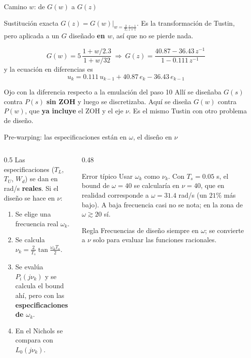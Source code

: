 \documentclass[aspectratio=169,11pt]{beamer}
\begin{document}
\begin{frame}{Camino $w$: de $G(w)$ a $G(z)$}
  \small
  \begin{block}{Sustitución exacta}
    $G(z)=G(w)\big|_{w=\frac{2}{T_s}\frac{z-1}{z+1}}$. Es la transformación de Tustin, pero aplicada a un $G$ diseñado \textbf{en $w$}, así que no se pierde nada.
  \end{block}
  \[ G(w)=5\,\frac{1+w/2.3}{1+w/32}\ \Rightarrow\ G(z)=\frac{40.87-36.43\,z^{-1}}{1-0.111\,z^{-1}} \]
  y la ecuación en diferencias es
  \[ u_k=0.111\,u_{k-1}+40.87\,e_k-36.43\,e_{k-1} \]
  \begin{alertblock}{Ojo con la diferencia respecto a la emulación del paso 10}
    Allí se diseñaba $G(s)$ contra $P(s)$ \textbf{sin ZOH} y luego se discretizaba. Aquí se diseña $G(w)$ contra $P(w)$, que \textbf{ya incluye} el ZOH y el eje $\nu$. Es el mismo Tustin con otro problema de diseño.
  \end{alertblock}
\end{frame}

\begin{frame}{Pre-warping: las especificaciones están en $\omega$, el diseño en $\nu$}
  \footnotesize
  \begin{columns}[T]
  \begin{column}{0.5\textwidth}
    Las especificaciones ($T_L$, $T_U$, $W_d$) se dan en rad/s \textbf{reales}. Si el diseño se hace en $\nu$:
    \begin{enumerate}
      \item Se elige una frecuencia real $\omega_k$.
      \item Se calcula $\nu_k=\frac{2}{T_s}\tan\frac{\omega_kT_s}{2}$.
      \item Se evalúa $P_i(j\nu_k)$ y se calcula el bound ahí, pero con las \textbf{especificaciones de $\omega_k$}.
      \item En el Nichols se compara con $L_0(j\nu_k)$.
    \end{enumerate}
  \end{column}
  \begin{column}{0.48\textwidth}
    \begin{alertblock}{Error típico}
      Usar $\omega_k$ como $\nu_k$. Con $T_s=0.05$ s, el bound de $\omega=40$ se calcularía en $\nu=40$, que en realidad corresponde a $\omega=31.4$ rad/s (un $21\%$ más bajo). A baja frecuencia casi no se nota; en la zona de $\omega\gtrsim20$ sí.
    \end{alertblock}
    \begin{block}{Regla}
      Frecuencias de diseño siempre en $\omega$; se convierte a $\nu$ solo para evaluar las funciones racionales.
    \end{block}
  \end{column}
  \end{columns}
\end{frame}
\end{document}
